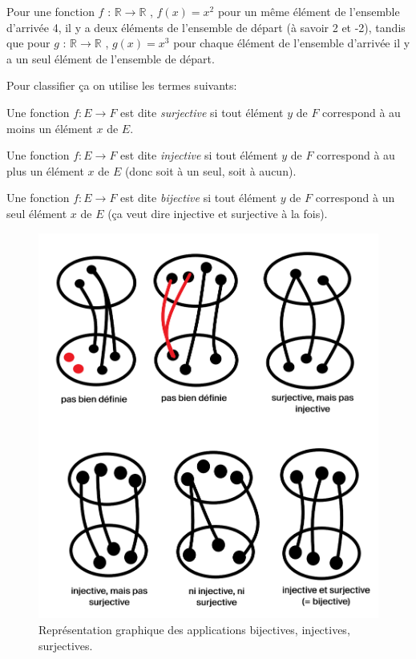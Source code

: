 Pour une fonction $f$ : $\mathbb{R} \to \mathbb{R}$ , $f(x) = x^2$ pour un même élément de l'ensemble d'arrivée 4, il y a deux éléments de l'ensemble de départ (à savoir 2 et -2), tandis que pour $g$ : $\mathbb{R} \to \mathbb{R}$ , $g(x) = x^3$ pour chaque élément de l'ensemble d'arrivée il y a un seul élément de l'ensemble de départ.

Pour classifier ça on utilise les termes suivants:

\begin{boxdef}
Une fonction $f : E \to F$ est dite \textit{surjective} si tout élément $y$ de $F$ correspond à au moins un élément $x$ de $E$.
\end{boxdef}

\begin{boxdef}
 Une fonction $f : E \to F$ est dite \textit{injective} si tout élément $y$ de $F$ correspond à au plus un élément $x$ de $E$ (donc soit à un seul, soit à aucun).
\end{boxdef}

\begin{boxdef}
Une fonction $f : E \to F$ est dite \textit{bijective} si tout élément $y$ de $F$ correspond à un seul élément $x$ de $E$ (ça veut dire injective et surjective à la fois). 
\end{boxdef}


\begin{figure}[h!]
\centerline{\includegraphics[scale=0.5]{content/bijectives.png}}
\caption{Représentation graphique des applications bijectives, injectives, surjectives.}
\label{sheesh}
\end{figure}

